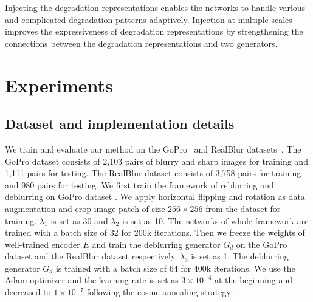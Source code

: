 \documentclass[runningheads]{llncs}
\begin{document}
Injecting the degradation representations enables the networks to handle various and complicated degradation patterns adaptively.
Injection at multiple scales improves the expressiveness of degradation representations by strengthening the connections between the degradation representations and two generators.


\section{Experiments}
\subsection{Dataset and implementation details}
We train and evaluate our method on the GoPro~\cite{deblur-multi-scale} and RealBlur datasets~\cite{realblur}. The GoPro dataset consists of 2,103 pairs of blurry and sharp images for training and 1,111 pairs for testing. The RealBlur dataset consists of 3,758 pairs for training and 980 pairs for testing. We first train the framework of reblurring and deblurring on GoPro dataset \cite{deblur-multi-scale}. 
We apply horizontal flipping and rotation as data augmentation and crop image patch of size $256 \times 256$ from the dataset for training.
$\lambda_1$ is set as 30 and $\lambda_2$ is set as 10. 
The networks of whole framework are trained with a batch size of 32 for 200k iterations. 
Then we freeze the weights of well-trained encoder $E$ and train the deblurring generator $G_d$ on the GoPro dataset \cite{deblur-multi-scale} and the RealBlur dataset \cite{realblur} respectively. $\lambda_3$ is set as 1. 
The deblurring generator $G_d$ is trained with a batch size of 64 for 400k iterations.
We use the Adam optimizer and the learning rate is set as $3 \times 10^{-4}$ at the beginning and decreased to $1 \times 10^{-7}$ following the cosine annealing strategy \cite{cosine_annealing}. 
\end{document}
